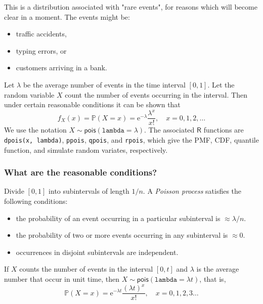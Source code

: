This is a distribution associated with "rare events", for reasons
which will become clear in a moment. The events might be:
\begin{itemize}
\item traffic accidents,
\item typing errors, or
\item customers arriving in a bank.
\end{itemize}

Let \(\lambda\) be the average number of events in the time interval
\([0,1]\). Let the random variable \(X\) count the number of events
occurring in the interval. Then under certain reasonable conditions it
can be shown that
\begin{equation}
f_{X}(x)=\mathbb{P}(X=x)=\mathrm{e}^{-\lambda}\frac{\lambda^{x}}{x!},\quad x=0,1,2,\ldots
\end{equation}
We use the notation
\(X\sim\mathsf{pois}(\mathtt{lambda}=\lambda)\). The associated
\(\mathsf{R}\) functions are \texttt{dpois(x, lambda)}, \texttt{ppois}, \texttt{qpois}, and
\texttt{rpois}, which give the PMF, CDF, quantile function, and simulate
random variates, respectively.

\subsubsection{What are the reasonable conditions?}
\label{sec-5-6-3-2}

Divide \([0,1]\) into subintervals of length \(1/n\). A \emph{Poisson
process}  satisfies the following conditions:
\begin{itemize}
\item the probability of an event occurring in a particular subinterval is
\(\approx\lambda/n\).
\item the probability of two or more events occurring in any subinterval
is \(\approx 0\).
\item occurrences in disjoint subintervals are independent.
\end{itemize}

\begin{rem}
\label{rem-poisson-process} If \(X\) counts the number of events in the
interval \([0,t]\) and \(\lambda\) is the average number that occur in
unit time, then \(X\sim\mathsf{pois}(\mathtt{lambda}=\lambda t)\),
that is,
\begin{equation}
\mathbb{P}(X=x)=\mathrm{e}^{-\lambda t}\frac{(\lambda t)^{x}}{x!},\quad x=0,1,2,3\ldots
\end{equation}
\end{rem}

